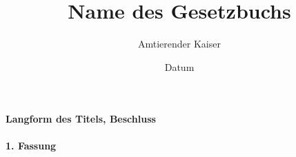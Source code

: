 \documentclass{article}
\title{Name des Gesetzbuchs}
\author{Amtierender Kaiser}
\date{Datum}
\begin{document}
\maketitle
\graphicspath{ {F:/global-files/server-laws/global/discord_law/RexNovusSMP/images} }
\vspace*{\fill}
\paragraph{Langform des Titels, Beschluss}

\newpage
{}
\vspace*{\fill}
\begin{Center}
\textbf{1. Fassung}
\vspace*{\fill}
\end{Center}
\newpage
\tableofcontents
\newpage

\end{document}
